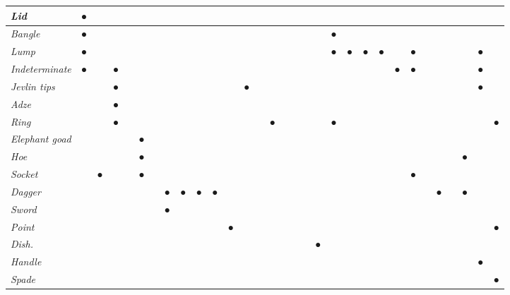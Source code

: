 \begin{longtable}{|l|l|l|l|l|l|l|l|l|l|l|l|l|l|l|l|l|l|l|l|l|l|l|l|l|l|l|l|l|l|l|}
\hline
\textit{Lid} & ● &  &  &  &  &  &  &  &  &  &  &  &  &  &  &  &  &  &  &  &  &  &  &  &  &  &  &  &  &  \\
\hline
\textit{Bangle} & ● &  &  &  &  &  &  &  &  &  &  &  &  &  &  &  &  &  & ● &  &  &  &  &  &  &  &  &  &  &  \\
\hline
\textit{Lump} & ● &  &  &  &  &  &  &  &  &  &  &  &  &  &  &  &  &  & ● & ● & ● & ● &  & ● &  &  &  &  & ● &  \\
\hline
\textit{Indeterminate} & ● &  & ● &  &  &  &  &  &  &  &  &  &  &  &  &  &  &  &  &  &  &  & ● & ● &  &  &  &  & ● &  \\
\hline
\textit{Jevlin tips} &  &  & ● &  &  &  &  &  &  &  &  & ● &  &  &  &  &  &  &  &  &  &  &  &  &  &  &  &  & ● &  \\
\hline
\textit{Adze} &  &  & ● &  &  &  &  &  &  &  &  &  &  &  &  &  &  &  &  &  &  &  &  &  &  &  &  &  &  &  \\
\hline
\textit{Ring} &  &  & ● &  &  &  &  &  &  &  &  &  &  & ● &  &  &  &  & ● &  &  &  &  &  &  &  &  &  &  & ● \\
\hline
\textit{Elephant goad} &  &  &  &  & ● &  &  &  &  &  &  &  &  &  &  &  &  &  &  &  &  &  &  &  &  &  &  &  &  &  \\
\hline
\textit{Hoe} &  &  &  &  & ● &  &  &  &  &  &  &  &  &  &  &  &  &  &  &  &  &  &  &  &  &  &  & ● &  &  \\
\hline
\textit{Socket} &  & ● &  &  & ● &  &  &  &  &  &  &  &  &  &  &  &  &  &  &  &  &  &  & ● &  &  &  &  &  &  \\
\hline
\textit{Dagger} &  &  &  &  &  &  & ● & ● & ● & ● &  &  &  &  &  &  &  &  &  &  &  &  &  &  &  & ● &  & ● &  &  \\
\hline
\textit{Sword} &  &  &  &  &  &  & ● &  &  &  &  &  &  &  &  &  &  &  &  &  &  &  &  &  &  &  &  &  &  &  \\
\hline
\textit{Point} &  &  &  &  &  &  &  &  &  &  & ● &  &  &  &  &  &  &  &  &  &  &  &  &  &  &  &  &  &  & ● \\
\hline
\textit{Dish.} &  &  &  &  &  &  &  &  &  &  &  &  &  &  &  &  &  & ● &  &  &  &  &  &  &  &  &  &  &  &  \\
\hline
\textit{Handle} &  &  &  &  &  &  &  &  &  &  &  &  &  &  &  &  &  &  &  &  &  &  &  &  &  &  &  &  & ● &  \\
\hline
\textit{Spade} &  &  &  &  &  &  &  &  &  &  &  &  &  &  &  &  &  &  &  &  &  &  &  &  &  &  &  &  &  & ● \\
\hline
\end{longtable}


